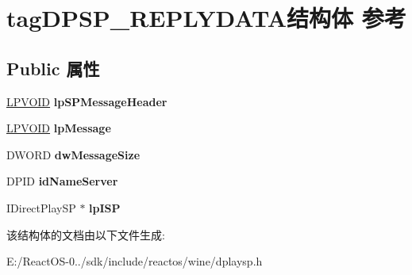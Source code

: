 \hypertarget{structtag_d_p_s_p___r_e_p_l_y_d_a_t_a}{}\section{tag\+D\+P\+S\+P\+\_\+\+R\+E\+P\+L\+Y\+D\+A\+T\+A结构体 参考}
\label{structtag_d_p_s_p___r_e_p_l_y_d_a_t_a}
\subsection*{Public 属性}
\begin{DoxyCompactItemize}
\item 
\mbox{\label{structtag_d_p_s_p___r_e_p_l_y_d_a_t_a_a001d497a342718352d137a9962b738c1}} 
\hyperlink{interfacevoid}{L\+P\+V\+O\+ID} {\bfseries lp\+S\+P\+Message\+Header}
\item 
\mbox{\label{structtag_d_p_s_p___r_e_p_l_y_d_a_t_a_a855824df02e6371e8d4fd1509b17c2ce}} 
\hyperlink{interfacevoid}{L\+P\+V\+O\+ID} {\bfseries lp\+Message}
\item 
\mbox{\label{structtag_d_p_s_p___r_e_p_l_y_d_a_t_a_a88df984c498cda5ed1d1abf44c3983c3}} 
D\+W\+O\+RD {\bfseries dw\+Message\+Size}
\item 
\mbox{\label{structtag_d_p_s_p___r_e_p_l_y_d_a_t_a_a37c214518593ef3da4cae6a3a5d9cfdc}} 
D\+P\+ID {\bfseries id\+Name\+Server}
\item 
\mbox{\label{structtag_d_p_s_p___r_e_p_l_y_d_a_t_a_a84d51088f5888d6e8a4e0368a129f927}} 
I\+Direct\+Play\+SP $\ast$ {\bfseries lp\+I\+SP}
\end{DoxyCompactItemize}


该结构体的文档由以下文件生成\+:\begin{DoxyCompactItemize}
\item 
E\+:/\+React\+O\+S-\/0../sdk/include/reactos/wine/dplaysp.\+h\end{DoxyCompactItemize}
